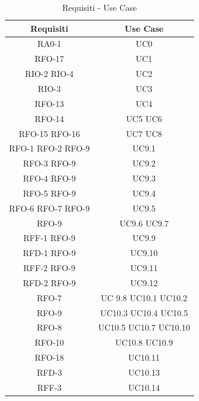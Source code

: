 \newpage
{}
\begin{table}[h]
\begin{center}
     \begin{tabular}
           {@{\extracolsep{\fill}}|c|c|}
     \hline
      \textbf{Requisiti} & \textbf{Use Case} \\
      \hline
     RA0-1 & UC0 \\
     \hline
     RFO-17 & UC1  \\
     \hline
     RIO-2  RIO-4 & UC2\\
     \hline
     RIO-3 & UC3 \\
     \hline
     RFO-13 & UC4 \\
     \hline
     RFO-14 & UC5 UC6 \\
      \hline
     RFO-15 RFO-16 & UC7 UC8 \\
     \hline
     RFO-1 RFO-2 RFO-9 & UC9.1 \\
     \hline
     RFO-3 RFO-9 &  UC9.2 \\
     \hline
     RFO-4 RFO-9 & UC9.3 \\
     \hline
     RFO-5 RFO-9 & UC9.4 \\
     \hline
     RFO-6 RFO-7 RFO-9 & UC9.5 \\
     \hline
     RFO-9 & UC9.6 UC9.7 \\
     \hline
     RFF-1 RFO-9 & UC9.9 \\
     \hline
     RFD-1 RFO-9 & UC9.10 \\
     \hline
     RFF-2 RFO-9 & UC9.11 \\
     \hline 
     RFD-2 RFO-9 & UC9.12 \\
     \hline
     RFO-7 & UC 9.8 UC10.1 UC10.2 \\
     \hline
     RFO-9 & UC10.3 UC10.4 UC10.5 \\
     \hline
     RFO-8 & UC10.5 UC10.7 UC10.10 \\
     \hline
     RFO-10 & UC10.8 UC10.9 \\
     \hline
     RFO-18 & UC10.11 \\
     \hline
     RFD-3 & UC10.13 \\
     \hline
     RFF-3 & UC10.14 \\
     
    \hline %
    \end{tabular}
  \caption{Requisiti - Use Case} %
  \label{tab:requisiti}
  \end{center}
\end{table}
